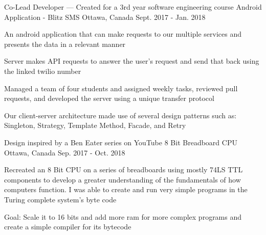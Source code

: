 
\begin{cventries}

  \cventry
    {Co-Lead Developer --- Created for a 3rd year software engineering course} %
    {Android Application - Blitz SMS} %
    {Ottawa, Canada} %
    {Sept. 2017 - Jan. 2018} %
    {
      \begin{cvitems} %
        \item An android application that can make requests to our multiple services and presents the data in a relevant manner
        \item Server makes API requests to answer the user's request and send that back using the linked twilio number
        \item Managed a team of four students and assigned weekly tasks, reviewed pull requests, and developed the server using a unique transfer protocol
        \item Our client-server architecture made use of several design patterns such as: Singleton, Strategy, Template Method, Facade, and Retry
      \end{cvitems}
    }

  \cventry
    {Design inspired by a Ben Eater series on YouTube} %
    {8 Bit Breadboard CPU} %
    {Ottawa, Canada} %
    {Sep. 2017 - Oct. 2018} %
    {
      \begin{cvitems} %
        \item Recreated an 8 Bit CPU on a series of breadboards using mostly 74LS TTL components to develop a greater understanding of the fundamentals of how computers function. I was able to create and run very simple programs in the Turing complete system's byte code
        \item Goal: Scale it to 16 bits and add more ram for more complex programs and create a simple compiler for its bytecode
      \end{cvitems}
    }

\end{cventries}

